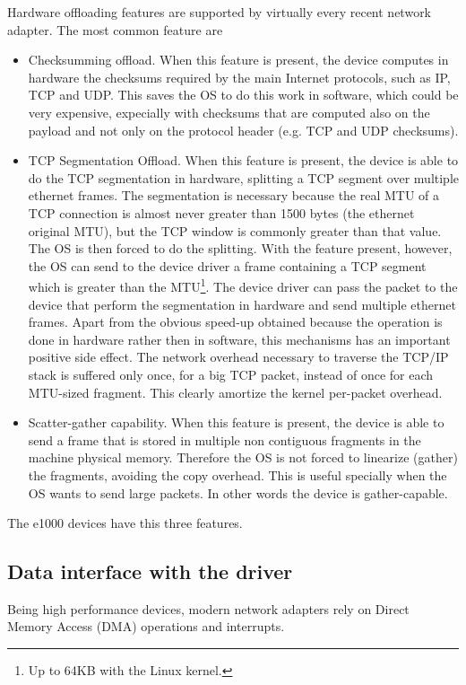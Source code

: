 Hardware offloading features are supported by virtually every recent network adapter.
The most common feature are
\begin{itemize}
    \item Checksumming offload. When this feature is present, the device computes in hardware the checksums required by the main Internet 
	  protocols, such as IP, TCP and UDP. This saves the OS to do this work in software, which could be very expensive, expecially 
	  with checksums that are computed also on the payload and not only on the protocol header (e.g. TCP and UDP checksums).
	  
    \item TCP Segmentation Offload. When this feature is present, the device is able to do the TCP segmentation in hardware, splitting
	  a TCP segment over multiple ethernet frames. The segmentation is necessary because the real MTU of a TCP connection is almost
	  never greater than 1500 bytes (the ethernet original MTU), but the TCP window is commonly greater than that value. The OS
	  is then forced to do the splitting. With the feature present, however, the OS can send to the device driver a frame containing a 
	  TCP segment which is greater than the MTU\footnote{Up to 64KB with the Linux kernel.}. The device driver can pass the packet to
	  the device that perform the segmentation in hardware and send multiple ethernet frames.
	  Apart from the obvious speed-up obtained because the operation is done in hardware rather then in software, this mechanisms has 
	  an important positive side effect. The network overhead necessary to traverse the TCP/IP stack is suffered only once, for a
	  big TCP packet, instead of once for each MTU-sized fragment. This clearly amortize the kernel per-packet overhead.
	  
    \item Scatter-gather capability. When this feature is present, the device is able to send a frame that is stored in multiple non
	  contiguous fragments in the machine physical memory. Therefore the OS is not forced to linearize (gather) the fragments,
	  avoiding the copy overhead. This is useful specially when the OS wants to send large packets. In other words the device is 
	  gather-capable.
\end{itemize}
The e1000 devices have this three features.


\subsection{Data interface with the driver}
Being high performance devices, modern network adapters rely on Direct Memory Access (DMA) operations and interrupts.

